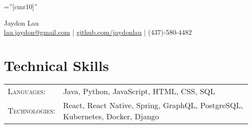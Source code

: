 \documentclass[a4paper,11pt]{article}
\begin{document}
\pagestyle{empty} %

\font\fb=''[cmr10]'' %

\par{\centering
		{\Huge Jaydon Lau
	}\\ \vspace{1.4mm} 
	\faEnvelopeO \hspace{0.4mm} \href{mailto:lau.jaydon@gmail.com}{lau.jaydon@gmail.com} \hspace{0.4mm} | \hspace{0.4mm} \faGithub \hspace{0.4mm} \href{https://github.com/jaydonlau}{github.com/jaydonlau}  \hspace{0.4mm} | \hspace{0.4mm} \faPhone \hspace{0.4mm} (437)-580-4482
	\par}


\section{Technical Skills}
\vspace{5pt}
\begin{tabular}{@{}ll}
\textsc{Languages:} & Java, Python, JavaScript, HTML, CSS, SQL \\
\textsc{Technologies:} & React, React Native, Spring, GraphQL, PostgreSQL, Kubernetes, Docker, Django \\
\end{tabular}

\end{document}
